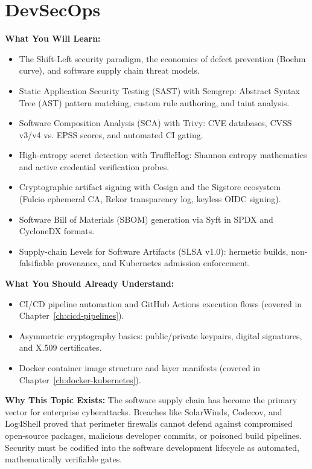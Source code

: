\chapter{DevSecOps}
\label{ch:devsecops}

\begin{chaptergoalsbox}
\textbf{What You Will Learn:}
\begin{itemize}[leftmargin=12pt]
  \item The Shift-Left security paradigm, the economics of defect prevention (Boehm curve), and software supply chain threat models.
  \item Static Application Security Testing (SAST) with Semgrep: Abstract Syntax Tree (AST) pattern matching, custom rule authoring, and taint analysis.
  \item Software Composition Analysis (SCA) with Trivy: CVE databases, CVSS v3/v4 vs. EPSS scores, and automated CI gating.
  \item High-entropy secret detection with TruffleHog: Shannon entropy mathematics and active credential verification probes.
  \item Cryptographic artifact signing with Cosign and the Sigstore ecosystem (Fulcio ephemeral CA, Rekor transparency log, keyless OIDC signing).
  \item Software Bill of Materials (SBOM) generation via Syft in SPDX and CycloneDX formats.
  \item Supply-chain Levels for Software Artifacts (SLSA v1.0): hermetic builds, non-falsifiable provenance, and Kubernetes admission enforcement.
\end{itemize}

\textbf{What You Should Already Understand:}
\begin{itemize}[leftmargin=12pt]
  \item CI/CD pipeline automation and GitHub Actions execution flows (covered in Chapter~\ref{ch:cicd-pipelines}).
  \item Asymmetric cryptography basics: public/private keypairs, digital signatures, and X.509 certificates.
  \item Docker container image structure and layer manifests (covered in Chapter~\ref{ch:docker-kubernetes}).
\end{itemize}

\textbf{Why This Topic Exists:}
The software supply chain has become the primary vector for enterprise cyberattacks. Breaches like SolarWinds, Codecov, and Log4Shell proved that perimeter firewalls cannot defend against compromised open-source packages, malicious developer commits, or poisoned build pipelines. Security must be codified into the software development lifecycle as automated, mathematically verifiable gates.


\end{chaptergoalsbox}
